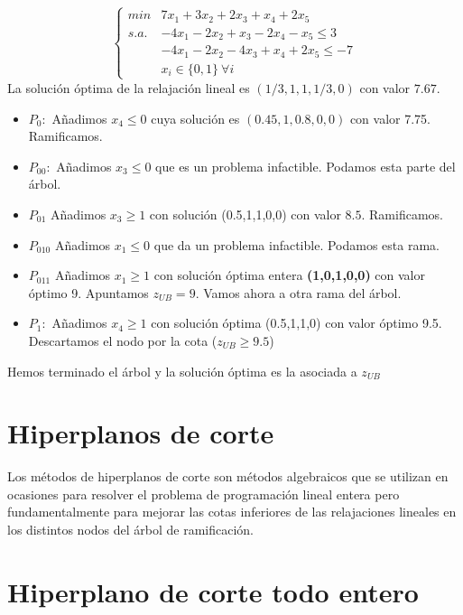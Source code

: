 \documentclass[openany]{book}
\begin{document}
\begin{example}
  $$ \left\{
  \begin{array}{ll}
    min & 7x_1+3x_2+2x_3+x_4+2x_5\\
    s.a. & -4x_1-2x_2+x_3-2x_4 -x_5 \leq 3\\
    & -4x_1-2x_2-4x_3+x_4+2x_5 \leq -7 \\
    & x_i \in \{0,1\} \ \forall i
  \end{array}
  \right. $$
  La solución óptima de la relajación lineal es $ (1/3,1,1,1/3,0) $ con valor $ 7.67 $.
  \begin{itemize}
    \item $ P_0: $ Añadimos $ x_4 \leq 0 $ cuya solución es $ (0.45,1,0.8,0,0)$ con valor 7.75. Ramificamos.
    \item $ P_{00}: $ Añadimos $ x_3 \leq 0 $ que es un problema infactible. Podamos esta parte del árbol.
    \item $ P_{01} $ Añadimos $ x_{3} \geq 1 $ con solución (0.5,1,1,0,0) con valor $ 8.5 $. Ramificamos.
    \item $ P_{010} $ Añadimos $ x_1 \leq 0 $ que da un problema infactible. Podamos esta rama.
    \item $ P_{011} $ Añadimos $ x_1 \geq 1 $ con solución óptima entera \textbf{(1,0,1,0,0)} con valor óptimo 9. Apuntamos $ z_{UB} = 9  $. Vamos ahora a otra rama del árbol.
    \item $ P_1: $ Añadimos $ x_4 \geq 1 $ con solución óptima (0.5,1,1,0) con valor óptimo 9.5. Descartamos el nodo por la cota ($ z_{UB} \geq 9.5 $)
  \end{itemize}
  Hemos terminado el árbol y la solución óptima es la asociada a $ z_{UB} $
\end{example}


\section{Hiperplanos de corte}

Los métodos de hiperplanos de corte son métodos algebraicos que se utilizan en ocasiones para resolver el problema de programación lineal entera pero fundamentalmente para mejorar las cotas inferiores de las relajaciones lineales en los distintos nodos del árbol de ramificación.

\section{Hiperplano de corte todo entero}
\end{document}
